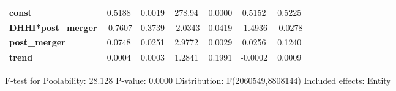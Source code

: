 \documentclass{report}
\begin{document}
\begin{center}
\begin{tabular}{lcccccc}
\midrule
\textbf{const}             &       0.5188       &       0.0019       &      278.94     &      0.0000      &       0.5152      &       0.5225       \\
\textbf{DHHI*post\_merger} &      -0.7607       &       0.3739       &     -2.0343     &      0.0419      &      -1.4936      &      -0.0278       \\
\textbf{post\_merger}      &       0.0748       &       0.0251       &      2.9772     &      0.0029      &       0.0256      &       0.1240       \\
\textbf{trend}             &       0.0004       &       0.0003       &      1.2841     &      0.1991      &      -0.0002      &       0.0009       \\
\bottomrule
\end{tabular}
\end{center}

F-test for Poolability: 28.128 \newline
 P-value: 0.0000 \newline
 Distribution: F(2060549,8808144) \newline
  \newline
 Included effects: Entity
\end{document}
